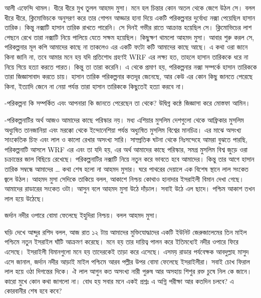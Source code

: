 \documentclass[
]{book}
\begin{document}
আলী এফেন্দি থামল। ধীরে ধীরে মুখ তুলল আহমদ মুসা। মনে হল চিন্তার কোন অতল থেকে জেগে উঠল সে। বলল ধীরে ধীরে, ক্লিমোভিচকে অনুসরণ করে তার গোপন আড্ডার হানা দিয়ে একটি পরিকল্পনার দুর্বোধ্য নক্সা পেয়েছিল হাসান তারিক। কিন্তু নক্সাটি হাসান তারিক রাখতে পারেনি। সে দিনই গভীর রাতে আক্রান্ত হয়েছিল সে। ক্লিমোভিচের লাশ পেছনে রেখে তারা নক্সাটি নিয়ে পালিয়ে যেতে সক্ষম হয়েছিল। কিছুক্ষণ থামলো আহমদ মুসা। আবার শুরু করল সে, পরিকল্পনার মূল কপি আমাদের কাছে না তাকলেও এর একটি ফটো কটি আমাদের কাছে আছে। এ কথা ওরা জানে কিনা জানি না, তবে আমার মনে হয় যদি প্রতিশোধ গ্রহণই WRF এর লক্ষ্য হত, তাহলে হাসান তারিককে ধরে না নিয়ে গিয়ে হত্যা করতে পারত। কিন্তু তা তারা করেনি। এ থেকে প্রমাণ হয়, পরিকল্পনার নক্সা সম্পর্কে হাসান তারিককে তারা জিজ্ঞাসাবাদ করতে চায়। হাসান তারিক পরিকল্পনার কতদূর জেনেছে, আর কেউ এর কোন কিছু জানতে পেরেছে কিনা, ইত্যাদি জেনে না নেয়া পর্যন্ত তারা হাসান তারিককে কিছুতেই হত্যা করবে না।

-পরিকল্পনা কি সম্পর্কিত এবং আপনারা কি জানতে পেরেছেন তা থেকে? উদ্বিগ্ন কন্ঠে জিজ্ঞাসা করে মোস্তফা আমিন।

-পরিকল্পনাটির অর্থ আজও আমাদের কাছে পরিস্কার নয়। মধ্য এশিয়ার মুসলিম দেশগুলো থেকে আফ্রিকার মুসলিম অধ্যুষিত তানজানিয়া এবং মরক্কো থেকে ইন্দোনেশিয়া পর্যন্ত অধ্যুষিত মুসলিম বিশ্বের মানচিত্র। এর মাঝে অসংখ্য সাংকেতিক চিহ্ন এবং লাল ও কালো রেখার অসংখ্য সারি। সাম্প্রতিক ঘটনা থেকে নিঃসন্দেহে আমরা বুঝতে পারছি, পরিকল্পনাটি আসলে WRF এর এবং তা যদি হয়, এর অর্থ আমাদের কাছে পরিস্কার, সমগ্র মুসলিম বিশ্ব জুড়ে ওরা চক্রান্তের জাল বিছিয়ে রেখেছে। পরিকল্পনাটির নক্সাটি নিয়ে নতুন করে ভাবতে হবে আমাদের। কিন্তু তার আগে হাসান তারিক সম্বন্ধে আমাদের \ldots{} কথা শেষ হলো না আহমদ মুসার। ঘরে পাথরের দেয়ালে এক বিশেষ স্থানে লাল সংকেত জ্বলে উঠল। আহমদ মুসা সেদিকে তাকিয়ে বলল, আকাশে নিশ্চয় কোথাও হানাদার ইসরাইলী বিমান দেখা গেছে। আমাদের রাডারের সংকেত ওটা। আসুন বলে আহমদ মুসা উঠে দাঁড়াল। সবাই উঠে এল ছাদে। পশ্চিম আকাশ তখন লাল হয়ে উঠেছে।

জর্দান নদীর ওপারে বোমা ফেলেছে ইহুদিরা নিশ্চয়। বলল আহমদ মুসা।

ঘড়ি দেখে আব্দুর রশিদ বলল, আজ রাত ১২ টায় আমাদের মুক্তিযোদ্ধাদের একটি ইউনিট জেরুজালেমের তিন মাইল পশ্চিমে নতুন ইসরাইল ঘাঁটি আক্রমণ করেছে। মনে হয় তার দায়িত্ব পালন করে ইতিমধ্যেই নদীর ওপারে ফিরে এসেছে। ইসরাইলী বিমানগুলো মনে হয় তাদেরকেই তাড়া করে এসেছে। এসময় রাডার পর্যবেক্ষক আবদুল্লাহ মাসুদ এসে জানাল, জর্দান নদীর আড়াই মাইল পশ্চিমে আরব পল্লীর উপর বোমা ফেলেছে ইসরাইলীরা। সবাই চোখ ফিরাল লাল হয়ে ওঠা দিগন্তের দিকে। ঐ লাল আগুন কত অসংখ্য নারী পুরুষ আর অসহায় শিশুর রক্ত চুষে নিল কে জানে। কারো মুখে কোন কথা জাগলো না। বোধ হয় সবার মনে একই প্রশ্নঃ এ অগ্নি পরীক্ষা আর কতদিন চলবে? এ কোরবানীর শেষ হবে কবে?
\end{document}
